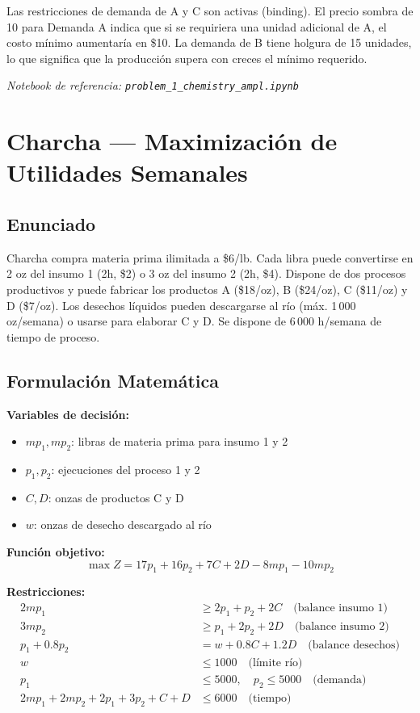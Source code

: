 \documentclass[12pt,a4paper]{article}
\begin{document}
Las restricciones de demanda de A y C son activas (binding). El precio sombra de 10 para Demanda A indica que si se requiriera una unidad adicional de A, el costo mínimo aumentaría en \$10. La demanda de B tiene holgura de 15 unidades, lo que significa que la producción supera con creces el mínimo requerido.

\textit{Notebook de referencia: \texttt{problem\_1\_chemistry\_ampl.ipynb}}

\newpage

\section{Charcha --- Maximización de Utilidades Semanales}

\subsection{Enunciado}

Charcha compra materia prima ilimitada a \$6/lb. Cada libra puede convertirse en 2 oz del insumo 1 (2h, \$2) o 3 oz del insumo 2 (2h, \$4). Dispone de dos procesos productivos y puede fabricar los productos A (\$18/oz), B (\$24/oz), C (\$11/oz) y D (\$7/oz). Los desechos líquidos pueden descargarse al río (máx. 1\,000 oz/semana) o usarse para elaborar C y D. Se dispone de 6\,000 h/semana de tiempo de proceso.

\subsection{Formulación Matemática}

\textbf{Variables de decisión:}
\begin{itemize}[nosep]
    \item $mp_1, mp_2$: libras de materia prima para insumo 1 y 2
    \item $p_1, p_2$: ejecuciones del proceso 1 y 2
    \item $C, D$: onzas de productos C y D
    \item $w$: onzas de desecho descargado al río
\end{itemize}

\textbf{Función objetivo:}
\[
\max Z = 17p_1 + 16p_2 + 7C + 2D - 8mp_1 - 10mp_2
\]

\textbf{Restricciones:}
\begin{align}
2mp_1 &\geq 2p_1 + p_2 + 2C \quad \text{(balance insumo 1)} \\
3mp_2 &\geq p_1 + 2p_2 + 2D \quad \text{(balance insumo 2)} \\
p_1 + 0.8p_2 &= w + 0.8C + 1.2D \quad \text{(balance desechos)} \\
w &\leq 1000 \quad \text{(límite río)} \\
p_1 &\leq 5000, \quad p_2 \leq 5000 \quad \text{(demanda)} \\
2mp_1 + 2mp_2 + 2p_1 + 3p_2 + C + D &\leq 6000 \quad \text{(tiempo)}
\end{align}
\end{document}
